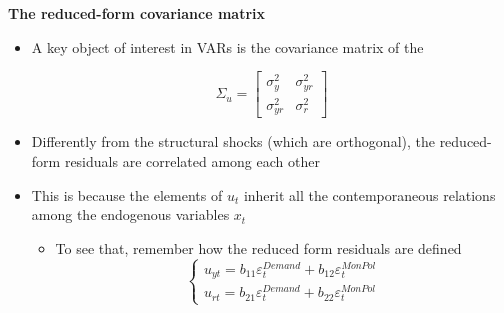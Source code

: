 \documentclass[10pt,english,t,aspectratio=169,ignorenonframetext]{beamer}
\begin{document}
\begin{frame}
{\textbf{The reduced-form covariance matrix}}

\begin{itemize}
\item A key object of interest in VARs is the covariance matrix of the {%
} 
\begin{equation*}
\Sigma _{u}=\left[ 
\begin{array}{cc}
\sigma _{y}^{2} & \sigma _{yr}^{2} \\ 
\sigma _{yr}^{2} & \sigma _{r}^{2}%
\end{array}%
\right]
\end{equation*}
\vspace{-.1cm}

\item Differently from the structural shocks (which are orthogonal), the
reduced-form residuals are correlated among each other\bigskip\pause

\item This is because the elements of $u_{t}$ inherit all the
contemporaneous relations among the endogenous variables $x_{t}$\smallskip

\begin{itemize}
\item To see that, remember how the reduced form residuals are defined%
\begin{equation*}
\left\{ 
\begin{array}{c}
u_{yt}=b_{11}\varepsilon _{t}^{Demand}+b_{12}\varepsilon _{t}^{MonPol} \\ 
u_{rt}=b_{21}\varepsilon _{t}^{Demand}+b_{22}\varepsilon _{t}^{MonPol}%
\end{array}%
\right.
\end{equation*}
\end{itemize}
\end{itemize}
\end{frame}

\end{document}

